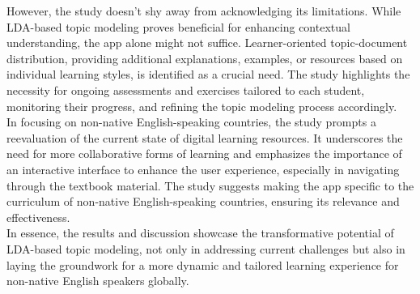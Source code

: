 \documentclass[sn-mathphys,Numbered]{sn-jnl}%
\theoremstyle{thmstyleone}%
\theoremstyle{thmstyletwo}%
\theoremstyle{thmstylethree}%
\begin{document}
However, the study doesn't shy away from acknowledging its limitations. While LDA-based topic modeling proves beneficial for enhancing contextual understanding, the app alone might not suffice. Learner-oriented topic-document distribution, providing additional explanations, examples, or resources based on individual learning styles, is identified as a crucial need. The study highlights the necessity for ongoing assessments and exercises tailored to each student, monitoring their progress, and refining the topic modeling process accordingly.\\

In focusing on non-native English-speaking countries, the study prompts a reevaluation of the current state of digital learning resources. It underscores the need for more collaborative forms of learning and emphasizes the importance of an interactive interface to enhance the user experience, especially in navigating through the textbook material. The study suggests making the app specific to the curriculum of non-native English-speaking countries, ensuring its relevance and effectiveness.\\

In essence, the results and discussion showcase the transformative potential of LDA-based topic modeling, not only in addressing current challenges but also in laying the groundwork for a more dynamic and tailored learning experience for non-native English speakers globally.\\


\end{document}
